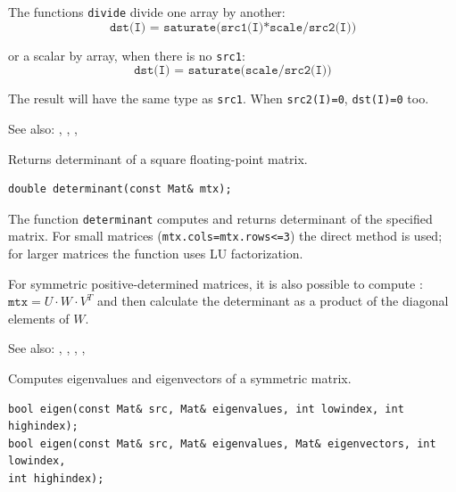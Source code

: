 The functions \texttt{divide} divide one array by another:
\[\texttt{dst(I) = saturate(src1(I)*scale/src2(I))} \]

or a scalar by array, when there is no \texttt{src1}:
\[\texttt{dst(I) = saturate(scale/src2(I))} \]

The result will have the same type as \texttt{src1}. When \texttt{src2(I)=0}, \texttt{dst(I)=0} too.

See also: , , , 

\label{determinant}

Returns determinant of a square floating-point matrix.

\begin{lstlisting}
double determinant(const Mat& mtx);
\end{lstlisting}
\begin{description}
\end{description}

The function \texttt{determinant} computes and returns determinant of the specified matrix. For small matrices (\texttt{mtx.cols=mtx.rows<=3})
the direct method is used; for larger matrices the function uses LU factorization.

For symmetric positive-determined matrices, it is also possible to compute : $\texttt{mtx}=U \cdot W \cdot V^T$ and then calculate the determinant as a product of the diagonal elements of $W$.

See also: , , , , 

\label{eigen}
Computes eigenvalues and eigenvectors of a symmetric matrix.

\begin{lstlisting}
bool eigen(const Mat& src, Mat& eigenvalues, int lowindex, int highindex);
bool eigen(const Mat& src, Mat& eigenvalues, Mat& eigenvectors, int lowindex,
int highindex);
\end{lstlisting}
\begin{description}
\end{description}

